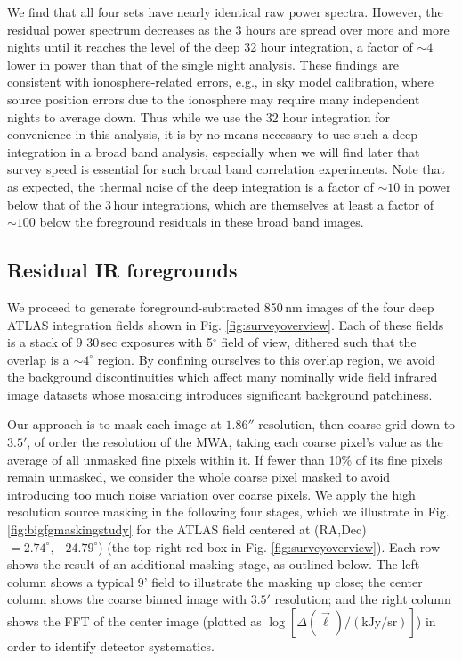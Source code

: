 \documentclass{emulateapj}
\begin{document}
We find that all four sets have nearly identical raw power spectra. However, the residual power spectrum decreases as the 3 hours are spread over more and more nights until it reaches the level of the deep 32 hour integration, a factor of $\sim4$ lower in power than that of the single night analysis. These findings are consistent with ionosphere-related errors, e.g., in sky model calibration, where source position errors due to the ionosphere may require many independent nights to average down. Thus while we use the 32 hour integration for convenience in this analysis, it is by no means necessary to use such a deep integration in a broad band analysis, especially when we will find later that survey speed is essential for such broad band correlation experiments. Note that as expected, the thermal noise of the deep integration is a factor of $\sim10$ in power below that of the 3\,hour integrations, which are themselves at least a factor of $\sim100$ below the foreground residuals in these broad band images.

\subsection{Residual IR foregrounds}
\label{sec:resirfg}

We proceed to generate foreground-subtracted 850\,nm images of the four deep ATLAS integration fields shown in Fig. \ref{fig:surveyoverview}. Each of these fields is a stack of 9 30\,sec exposures with 5$^\circ$ field of view, dithered such that the overlap is a $\sim4^\circ$ region. By confining ourselves to this overlap region, we avoid the background discontinuities which affect many nominally wide field infrared image datasets whose mosaicing introduces significant background patchiness. 

Our approach is to mask each image at $1.86''$ resolution, then coarse grid down to $3.5'$, of order the resolution of the MWA, taking each coarse pixel's value as the average of all unmasked fine pixels within it. If fewer than 10\% of its fine pixels remain unmasked, we consider the whole coarse pixel masked to avoid introducing too much noise variation over coarse pixels. We apply the high resolution source masking in the following four stages, which we illustrate in Fig. \ref{fig:bigfgmaskingstudy} for the ATLAS field centered at (RA,Dec)$=2.74^\circ, -24.79^\circ$) (the top right red box in Fig. \ref{fig:surveyoverview}). Each row shows the result of an additional masking stage, as outlined below. The left column shows a typical 9' field to illustrate the masking up close; the center column shows the coarse binned image with $3.5'$ resolution; and the right column shows the FFT of the center image (plotted as $\log[\Delta(\vec{\ell})/(\text{kJy/sr})]$) in order to identify detector systematics. 
\end{document}

